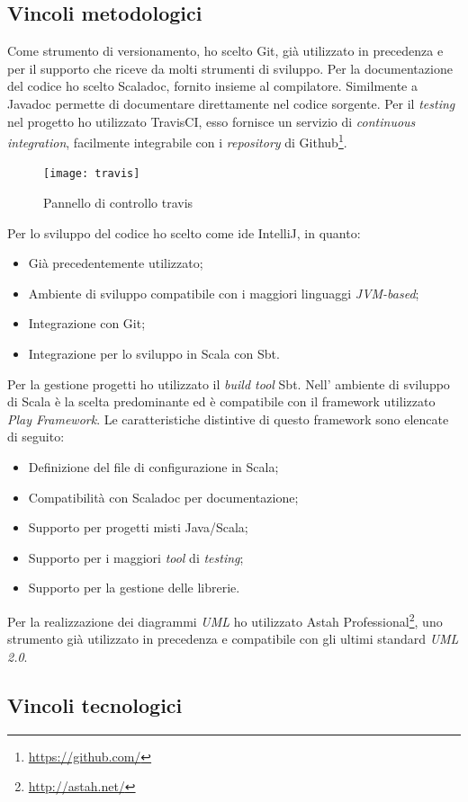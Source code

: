 \subsection{Vincoli metodologici}
Come strumento di versionamento, ho scelto Git, già utilizzato in precedenza e per il supporto che riceve da molti strumenti di sviluppo. Per la documentazione del codice ho scelto Scaladoc, fornito insieme al compilatore. Similmente a Javadoc permette di documentare direttamente nel codice sorgente. Per il \emph{testing} nel progetto ho utilizzato TravisCI, esso fornisce un servizio di \emph{continuous integration}, facilmente integrabile con i \emph{repository} di Github\footnote{\url{https://github.com/}}.
\begin{figure}[ht]
\centering
\texttt{[image: travis]}
\caption{Pannello di controllo travis}
\end{figure}
\newpage
Per lo sviluppo del codice ho scelto come \gls{ide} IntelliJ, in quanto:
\begin{itemize}
\item Già precedentemente utilizzato;
\item Ambiente di sviluppo compatibile con i maggiori linguaggi \emph{JVM-based};
\item Integrazione con Git;
\item Integrazione per lo sviluppo in Scala con Sbt.
\end{itemize}
Per la gestione progetti ho utilizzato il \emph{build tool} Sbt. Nell' ambiente di sviluppo di Scala è la scelta predominante ed è compatibile con il \gls{framework} utilizzato \emph{Play Framework}. Le caratteristiche distintive di questo \gls{framework} sono elencate di seguito:
\begin{itemize}
\item Definizione del file di configurazione in Scala;
\item Compatibilità con Scaladoc per documentazione;
\item Supporto per progetti misti Java/Scala;
\item Supporto per i maggiori \emph{tool} di \emph{testing};
\item Supporto per la gestione delle librerie.
\end{itemize}
Per la realizzazione dei diagrammi \emph{UML} ho utilizzato Astah Professional\footnote{\url{http://astah.net/}}, uno strumento già utilizzato in precedenza e compatibile con gli ultimi standard \emph{UML 2.0}.
\subsection{Vincoli tecnologici}
